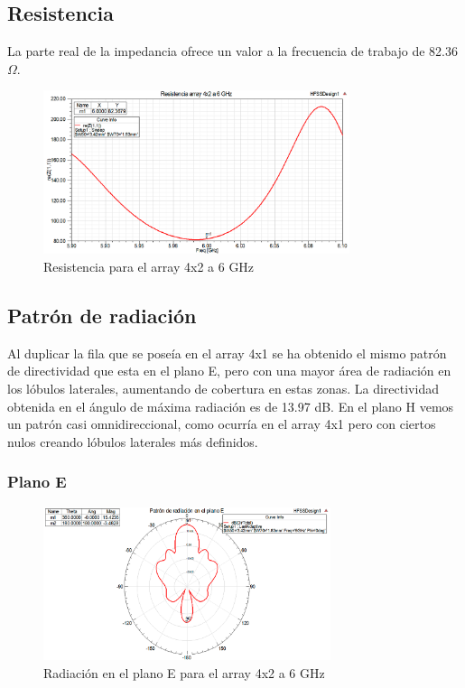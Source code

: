 \subsection{Resistencia}
\par La parte real de la impedancia ofrece un valor a la frecuencia de trabajo de 82.36 $\Omega$.
\\
\begin{figure}[H]
    \centering
        \includegraphics[width=0.8\textwidth]{archivos/analisis/4x22/3}
        \caption{Resistencia para el array 4x2 a 6 GHz}
        \label{fig:resis4x22}
\end{figure}

\subsection{Patrón de radiación}
\par Al duplicar la fila que se poseía en el array 4x1 se ha obtenido el mismo patrón de directividad que esta en el plano E, pero con una mayor área de radiación en los lóbulos laterales, aumentando de cobertura en estas zonas. La directividad obtenida en el ángulo de máxima radiación es de 13.97 dB. En el plano H vemos un patrón casi omnidireccional, como ocurría en el array 4x1 pero con ciertos nulos creando lóbulos laterales más definidos.
\\
\subsubsection{Plano E}
\begin{figure}[H]
    \centering
        \includegraphics[width=0.75\textwidth]{archivos/analisis/4x22/4}
        \caption{Radiación en el plano E para el array 4x2 a 6 GHz}
        \label{fig:E4x22}
\end{figure}

